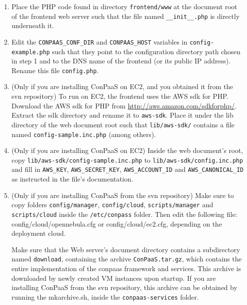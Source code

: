 \documentclass[10pt]{article}
\begin{document}
\begin{enumerate}
\item Place the PHP code found in directory \verb+frontend/www+ at the
  document root of the frontend web server such that the file named
  \verb+__init__.php+ is directly underneath it.

\item Edit the \verb+CONPAAS_CONF_DIR+ and \verb+CONPAAS_HOST+ variables in
  \verb+config-example.php+ such that they point to the configuration
  directory path chosen in step 1 and to the DNS name of the frontend
  (or its public IP address). Rename this file \verb+config.php+.

\item (Only if you are installing ConPaaS on EC2, and you obtained it 
  from the svn repository) To run on EC2, the frontend uses the AWS
  sdk for PHP. Download the AWS sdk for PHP from
  \url{http://aws.amazon.com/sdkforphp/}.  Extract the sdk directory
  and rename it to \verb+aws-sdk+. Place it under the lib directory of
  the web document root such that \verb+lib/aws-sdk/+ contains a
  file named \verb+config-sample.inc.php+ (among others).

\item (Only if you are installing ConPaaS on EC2) 
  Inside the web document's root, copy
  \verb+lib/aws-sdk/config-sample.inc.php+ to
  \verb+lib/aws-sdk/config.inc.php+ and fill in \verb+AWS_KEY+,
  \verb+AWS_SECRET_KEY+, \verb+AWS_ACCOUNT_ID+ and
  \verb+AWS_CANONICAL_ID+ as instructed in the file's documentation.

\item (Only if you are installing ConPaaS from the svn repository)
  Make sure to copy folders \verb+config/manager+, \verb+config/cloud+,
  \verb+scripts/manager+ and \verb+scripts/cloud+ inside the 
  \verb+/etc/conpass+ folder. Then edit the 
  following file: config/cloud/opennebula.cfg or config/cloud/ec2.cfg,
  depending on the deployment cloud.

  Make sure that the Web server's document directory contains a
  subdirectory named \verb+download+, containing the archive
  \verb+ConPaaS.tar.gz+, which contains the entire implementation
  of the conpaas framework and services. This archive is downloaded by newly
  created VM instances upon startup. If you are installing ConPaaS from the svn
  repository, this archive can be obtained
  by running the mkarchive.sh, inside the \verb+conpaas-services+ folder.

\end{enumerate}
\end{document}
